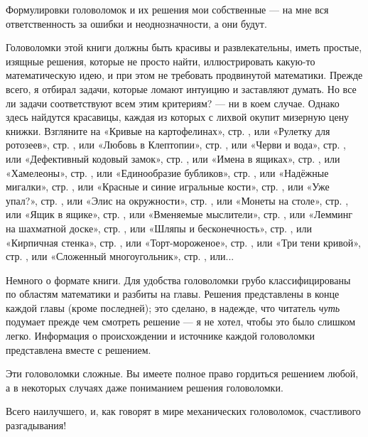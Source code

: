 Формулировки головоломок и их решения мои собственные --- на мне вся ответственность за ошибки и неоднозначности,
а они будут.

Головоломки этой книги должны быть красивы и развлекательны,
иметь простые, изящные решения, которые не просто найти,
иллюстрировать какую-то математическую идею,
и при этом не требовать продвинутой математики.
Прежде всего, я отбирал задачи, которые ломают интуицию и заставляют думать.
Но все ли задачи соответствуют всем этим критериям? --- ни в коем случае.
Однако здесь найдутся красавицы, каждая из которых с лихвой окупит мизерную цену книжки.
Взгляните на
«Кривые на картофелинах», стр. \pageref{Кривые на картофелинах}, или
«Рулетку для ротозеев», стр. \pageref{Рулетка для ротозеев}, или
«Любовь в Клептопии», стр. \pageref{Любовь в Клептопии}, или
«Черви и вода», стр. \pageref{Черви и вода}, или
«Дефективный кодовый замок», стр. \pageref{Дефективный кодовый замок}, или
«Имена в ящиках», стр. \pageref{Имена в ящиках}, или
«Хамелеоны», стр. \pageref{Хамелеоны}, или
«Единообразие бубликов», стр. \pageref{Единообразие бубликов}, или
«Надёжные мигалки», стр. \pageref{Надёжные мигалки}, или
«Красные и синие игральные кости», стр. \pageref{Красные и синие игральные кости}, или
«Уже упал?», стр. \pageref{Уже упал?}, или
«Элис на окружности», стр. \pageref{Элис на окружности}, или
«Монеты на столе», стр. \pageref{Монеты на столе}, или
«Ящик в ящике», стр. \pageref{Ящик в ящике}, или
«Вменяемые мыслители», стр. \pageref{Вменяемые мыслители}, или
«Лемминг на шахматной доске», стр. \pageref{Лемминг на шахматной доске}, или
«Шляпы и бесконечность», стр. \pageref{Шляпы и бесконечность}, или
«Кирпичная стенка», стр. \pageref{Кирпичная стенка}, или
«Торт-мороженое», стр. \pageref{Торт-мороженое}, или
«Три тени кривой», стр. \pageref{Три тени кривой}, или
«Сложенный многоугольник», стр. \pageref{Сложенный многоугольник}, или...

Немного о формате книги.
Для удобства головоломки грубо классифицированы по областям математики и
разбиты на главы.
Решения представлены в конце каждой главы (кроме последней);
это сделано, в надежде, что читатель \emph{чуть} подумает прежде чем смотреть решение --- я не хотел, чтобы это было слишком легко.
Информация о происхождении и источнике каждой головоломки представлена вместе с решением.

Эти головоломки сложные.
Вы имеете полное право гордиться решением любой, а в некоторых случаях даже пониманием решения головоломки.

Всего наилучшего, и, как говорят в мире механических головоломок, счастливого разгадывания!


